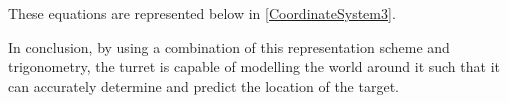 These equations are represented below in \autoref{CoordinateSystem3}.


In conclusion, by using a combination of this representation scheme and
trigonometry, the turret is capable of modelling the world around it such that
it can accurately determine and predict the location of the target.

%  

